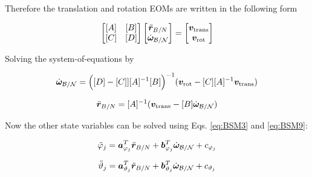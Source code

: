 Therefore the translation and rotation EOMs are written in the following form

\begin{equation}
	\begin{bmatrix}
		[A] & [B]\\
		[C] & [D]
	\end{bmatrix} \begin{bmatrix}
		\ddot{\bm r}_{B/N}\\
		\dot{\bm\omega}_{\cal B/N}
	\end{bmatrix} = \begin{bmatrix}
		\bm v_{\text{trans}}\\
		\bm v_{\text{rot}}
	\end{bmatrix}
\end{equation}

Solving the system-of-equations by

\begin{equation}
	\dot{\bm\omega}_{\cal B/N} = \Big([D] - [C]][A]^{-1}[B]\Big)^{-1}(\bm v_{\text{rot}} - [C][A]^{-1}\bm v_{\text{trans}})
	\label{eq:finalsystemomega}
\end{equation}

\begin{equation}
	\ddot{\bm r}_{B/N} = [A]^{-1} (\bm v_{\text{trans}} - [B]\dot{\bm\omega}_{\cal B/N})
	\label{eq:finalsystemr}
\end{equation}

Now the other state variables can be solved using Eqs. \eqref{eq:BSM3} and \eqref{eq:BSM9}: 

\begin{equation}
	\ddot{\varphi}_j  = \bm a_{\varphi_j}^T \ddot{\bm{r}}_{B/N} + \bm b_{\varphi_j}^T \dot{\bm\omega}_{\cal B/N} +c_{\varphi_j}
\end{equation}

\begin{equation}
	\ddot \vartheta_j = \bm a_{\vartheta_j}^T \ddot{\bm r}_{B/N} + \bm b_{\vartheta_j}^T \dot{\bm\omega}_{\cal B/N} + c_{\vartheta_j}
\end{equation}\\
